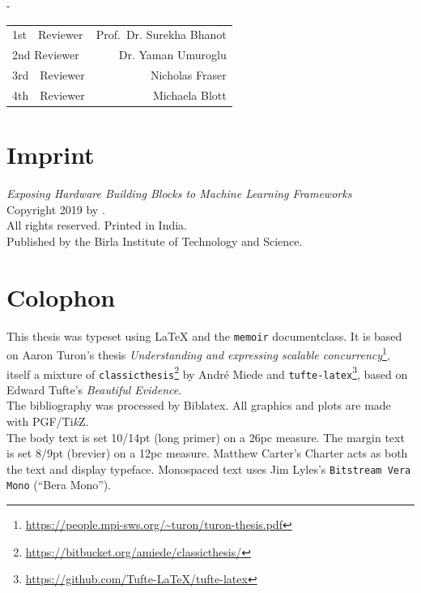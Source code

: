 {\begin{adjustwidth*}{\unitlength}{-\unitlength}
{            \begin{minipage}{0.5\textwidth}
            \begin{tabular}{lr}
                1st~~Reviewer & Prof.\ Dr. Surekha Bhanot\\
                2nd Reviewer & Dr.\; Yaman Umuroglu\\
                3rd~~Reviewer & Nicholas Fraser\\
                4th~~Reviewer & Michaela Blott
            \end{tabular}
            \end{minipage}
            \hspace*{36pt}
            \vfill
            }
            
        \vspace*{\baselineskip}
    \end{adjustwidth*}
}

\clearpage{}

\thispagestyle{empty}
\hphantom{.}
\vfill

\section*{Imprint}

\textit{Exposing Hardware Building Blocks to Machine Learning Frameworks}\\
Copyright \textcopyright{} 2019 by \theauthor{}.\\
All rights reserved. Printed in India.\\
Published by the Birla Institute of Technology and Science.

\section*{Colophon}

This thesis was typeset using \LaTeX{} and the \texttt{memoir} documentclass.
It is based on Aaron Turon's thesis \emph{Understanding and expressing scalable concurrency}\footnote{\url{https://people.mpi-sws.org/~turon/turon-thesis.pdf}}, itself a mixture of \texttt{classicthesis}\footnote{\url{https://bitbucket.org/amiede/classicthesis/}} by Andr\'e Miede and \texttt{tufte-latex}\footnote{\url{https://github.com/Tufte-LaTeX/tufte-latex}}, based on Edward Tufte's \emph{Beautiful Evidence}.\\[0.5\baselineskip]
%
The bibliography was processed by Biblatex.
All graphics and plots are made with PGF/Ti\emph{k}Z.\\[0.5\baselineskip]
%
The body text is set 10/14pt (long primer) on a 26pc measure.
The margin text is set 8/9pt (brevier) on a 12pc measure.
Matthew Carter's \textrm{Charter} acts as both the text and display typeface.
Monospaced text uses Jim Lyles's \texttt{Bitstream Vera Mono} (\enquote{Bera Mono}).

